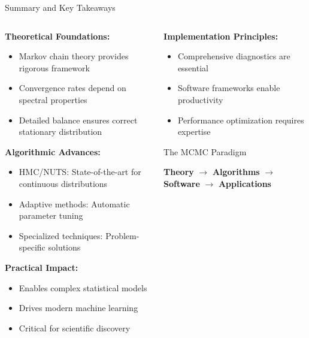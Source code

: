 \documentclass[aspectratio=169,11pt]{beamer}
\begin{document}
\begin{frame}{Summary and Key Takeaways}
\begin{columns}
\begin{column}{0.5\textwidth}
\textbf{Theoretical Foundations:}
\begin{itemize}
\item Markov chain theory provides rigorous framework
\item Convergence rates depend on spectral properties
\item Detailed balance ensures correct stationary distribution
\end{itemize}

\vspace{0.3cm}
\textbf{Algorithmic Advances:}
\begin{itemize}
\item HMC/NUTS: State-of-the-art for continuous distributions
\item Adaptive methods: Automatic parameter tuning
\item Specialized techniques: Problem-specific solutions
\end{itemize}

\vspace{0.3cm}
\textbf{Practical Impact:}
\begin{itemize}
\item Enables complex statistical models
\item Drives modern machine learning
\item Critical for scientific discovery
\end{itemize}
\end{column}
\begin{column}{0.5\textwidth}
\textbf{Implementation Principles:}
\begin{itemize}
\item Comprehensive diagnostics are essential
\item Software frameworks enable productivity
\item Performance optimization requires expertise
\end{itemize}

\vspace{0.3cm}
\begin{alertblock}{The MCMC Paradigm}
\begin{center}
\textbf{Theory} $\rightarrow$ \textbf{Algorithms} $\rightarrow$ \textbf{Software} $\rightarrow$ \textbf{Applications}
\end{center}
\end{alertblock}


\end{column}
\end{columns}
\end{frame}
\end{document}
